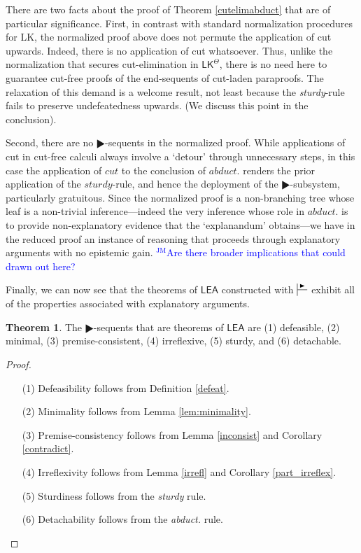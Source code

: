 \documentclass{article}
\theoremstyle{definition}
\newtheorem{theorem}{Theorem}
\theoremstyle{definition}
\theoremstyle{definition}
\theoremstyle{definition}
\theoremstyle{remark}
\theoremstyle{definition}
\theoremstyle{definition}
\newcommand{\jm}[1]{\textcolor{blue}{$^{\textrm{JM}}${#1}}}
\begin{document}
There are two facts about the proof of Theorem \ref{cutelimabduct} that are of particular significance. First, in contrast with standard normalization procedures for \textsf{LK}, the normalized proof above does not permute the application of cut upwards. Indeed, there is no application of cut whatsoever. Thus, unlike the normalization that secures cut-elimination in $ \mathsf{LK^\Theta}$, there is no need here to guarantee cut-free proofs of the end-sequents of cut-laden paraproofs. The relaxation of this demand is a welcome result, not least because the \textit{sturdy}-rule fails to preserve undefeatedness upwards. (We discuss this point in the conclusion). 

Second, there are no $ \RHD$-sequents in the normalized proof. While applications of cut in cut-free calculi always involve a `detour' through unnecessary steps, in this case the application of $ cut $ to the conclusion of $ abduct. $ renders the prior application of the $ sturdy $-rule, and hence the deployment of the $ \RHD$-subsystem, particularly gratuitous. Since the normalized proof is a non-branching tree whose leaf is a non-trivial inference---indeed the very inference whose role in $ abduct. $ is to provide non-explanatory evidence that the `explanandum' obtains---we have in the reduced proof an instance of reasoning that proceeds through explanatory arguments with no epistemic gain. \jm{Are there broader implications that could drawn out here?}

Finally, we can now see that the theorems of $ \mathsf{LEA}$ constructed with $ \sststile{}{\RHD} $ exhibit all of the properties associated with explanatory arguments.

\begin{theorem}\label{properties}
	The $ \RHD$-sequents that are theorems of $ \mathsf{LEA} $ are (1) defeasible, (2) minimal, (3) premise-consistent, (4) irreflexive, (5) sturdy, and (6) detachable.
	
	\begin{proof}
		\begin{itemize}
			\item[(1)] Defeasibility follows from Definition \ref{defeat}.
			\item[(2)] Minimality follows from Lemma \ref{lem:minimality}.
			\item[(3)] Premise-consistency follows from Lemma \ref{inconsist} and Corollary \ref{contradict}.
			\item[(4)] Irreflexivity follows from Lemma \ref{irrefl} and Corollary \ref{part_irreflex}.
			\item[(5)] Sturdiness follows from the \textit{sturdy} rule.
			\item[(6)] Detachability follows from the \textit{abduct.} rule.
		\end{itemize}
	\end{proof}
	
	
\end{theorem}
\end{document}
